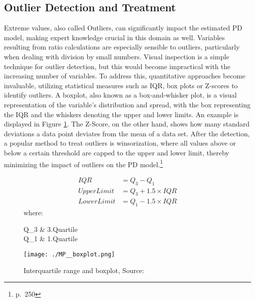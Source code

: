 \subsection{Outlier Detection and Treatment}
\label{sec:OutlTr}
Extreme values, also called Outliers, can significantly impact the estimated PD model, making expert knowledge crucial in this domain as well. Variables resulting from ratio calculations are especially sensible to outliers, particularly when dealing with division by small numbers. Visual inspection is a simple technique for outlier detection, but this would become impractical with the increasing number of variables. To address this, quantitative approaches become invaluable, utilizing statistical measures such as \ac{IQR}, box plots or Z-scores to identify outliers. A boxplot, also known as a box-and-whisker plot, is a visual representation of the variable's distribution and spread, with the box representing the \ac{IQR} and the whiskers denoting the upper and lower limits. An example is displayed in Figure \ref{fig:dp_iqr_boxpl}. The Z-Score, on the other hand, shows how many standard deviations a data point deviates from the mean of a data set. After the detection, a popular method to treat outliers is winsorization, where all values above or below a certain threshold are capped to the upper and lower limit, thereby minimizing the impact of outliers on the PD model.\footnote{\cite{Python:2022} p.~250}

\begin{figure}[H]
\begin{minipage}{.5\textwidth}
	\begin{align} 
	IQR &= Q_3 - Q_1 \label{eq:dp_iqr_boxpl1}\\
	Upper Limit &= Q_3 + 1.5 \times IQR \label{eq:dp_iqr_boxpl2}\\
	Lower Limit &= Q_1 - 1.5 \times IQR \label{eq:dp_iqr_boxpl3}
	\end{align}
	where:
	\begin{conditions}
	Q_{3}  		& 3.Quartile \\
	Q_{1}  		& 1.Quartile \\
	\end{conditions}
\end{minipage}%
\begin{minipage}{.5\textwidth}
	\centering
	\texttt{[image: ./MP\_\_boxplot.png]}
\end{minipage}
    \caption{Interquartile range and boxplot, Source: \cite{Boxplot:2019}}
    \label{fig:dp_iqr_boxpl}
\end{figure}

